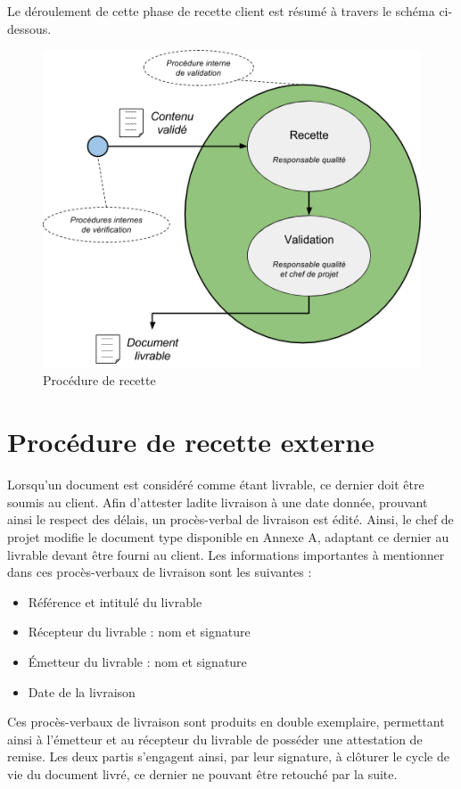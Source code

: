 Le déroulement de cette phase de recette client est résumé à travers le schéma ci-dessous.

\begin{figure}[H]
    \centering
    \label{fig-recette}
    \includegraphics[scale=0.5]{figures/recette_part.png}
    \caption{Procédure de recette}
\end{figure}

\section{Procédure de recette externe}

Lorsqu’un document est considéré comme étant livrable, ce dernier doit être soumis au client. Afin d’attester ladite livraison à une date donnée, prouvant ainsi le respect des délais, un procès-verbal de livraison est édité. Ainsi, le chef de projet modifie le document type disponible en Annexe A, adaptant ce dernier au livrable devant être fourni au client. Les informations importantes à mentionner dans ces procès-verbaux de livraison sont les suivantes : \\

\begin{itemize}
    \item[\textbullet] Référence et intitulé du livrable
    \item[\textbullet] Récepteur du livrable : nom et signature
    \item[\textbullet] Émetteur du livrable : nom et signature
    \item[\textbullet] Date de la livraison \\
\end{itemize}

Ces procès-verbaux de livraison sont produits en double exemplaire, permettant ainsi à l’émetteur et au récepteur du livrable de posséder une attestation de remise. Les deux partis s’engagent ainsi, par leur signature, à clôturer le cycle de vie du document livré, ce dernier ne pouvant être retouché par la suite.
